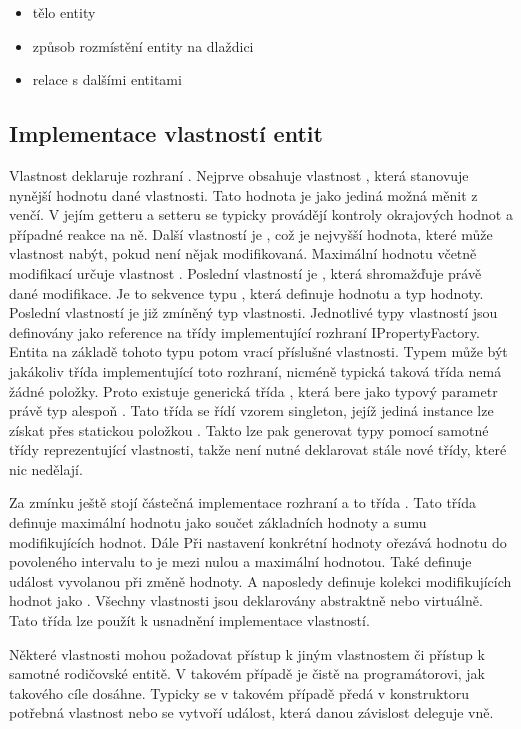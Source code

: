 \begin{itemize}
\item tělo entity
\item způsob rozmístění entity na dlaždici
\item relace s dalšími entitami
\end{itemize}

\subsection{Implementace vlastností entit}
Vlastnost deklaruje rozhraní . Nejprve obsahuje vlastnost , která stanovuje nynější hodnotu
dané vlastnosti. Tato hodnota je jako jediná možná měnit z venčí. V jejím getteru a setteru se typicky provádějí kontroly okrajových hodnot a případné reakce na ně. 
Další vlastností je , což je nejvyšší hodnota, které může vlastnost nabýt, pokud není nějak modifikovaná.
Maximální hodnotu včetně modifikací určuje vlastnost . Poslední vlastností je , která shromažďuje
právě dané modifikace. Je to sekvence typu , která definuje hodnotu a typ hodnoty. Poslední
vlastností je již zmíněný typ vlastnosti. Jednotlivé typy vlastností jsou definovány jako reference na třídy implementující
rozhraní IPropertyFactory. Entita na základě tohoto typu potom vrací příslušné vlastnosti. Typem může být jakákoliv 
třída implementující toto rozhraní, nicméně typická taková třída nemá žádné položky.
Proto existuje generická třída , která bere jako typový parametr právě typ alespoň .
Tato třída se řídí vzorem singleton, jejíž jediná instance lze získat přes statickou položkou . Takto lze pak 
generovat typy pomocí samotné třídy reprezentující vlastnosti, takže není nutné deklarovat stále nové třídy, které nic nedělají.

Za zmínku ještě stojí částečná implementace rozhraní  a to třída . Tato třída definuje 
maximální hodnotu jako součet základních hodnoty a sumu modifikujících hodnot. Dále Při nastavení konkrétní hodnoty ořezává
hodnotu do povoleného intervalu to je mezi nulou a maximální hodnotou. Také definuje událost vyvolanou při změně hodnoty.
 A naposledy definuje kolekci modifikujících hodnot jako . Všechny vlastnosti 
 jsou deklarovány abstraktně nebo virtuálně. Tato třída lze použít k usnadnění implementace vlastností.

 Některé vlastnosti mohou požadovat přístup k jiným vlastnostem či přístup k samotné rodičovské entitě. V takovém
 případě je čistě na programátorovi, jak takového cíle dosáhne. Typicky se v takovém případě předá v konstruktoru
 potřebná vlastnost nebo se vytvoří událost, která danou závislost deleguje vně. 

